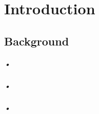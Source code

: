 \documentclass[12pt]{report}
\begin{document}
\newpage

\title{}
\author{GROUP CSCD018}      
\renewcommand{\today}{}

\maketitle
\tableofcontents

\chapter{Introduction}
\section{Background}
\paragraph{•}

\paragraph{•}

\paragraph{•}
\end{document}
